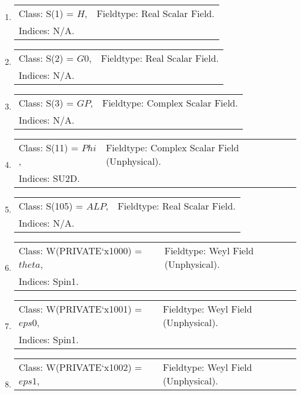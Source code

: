 \documentclass[11pt]{article}
\begin{document}
\begin{enumerate}
\item 
\begin{tabular}{ll}
Class: S(1) = $ H $, &  Fieldtype: Real Scalar Field.\\ 
\multicolumn{2}{l}{Indices: N/A.}\\ 
\end{tabular}
\item 
\begin{tabular}{ll}
Class: S(2) = $ G0 $, &  Fieldtype: Real Scalar Field.\\ 
\multicolumn{2}{l}{Indices: N/A.}\\ 
\end{tabular}
\item 
\begin{tabular}{ll}
Class: S(3) = $ GP $, &  Fieldtype: Complex Scalar Field.\\ 
\multicolumn{2}{l}{Indices: N/A.}\\ 
\end{tabular}
\item 
\begin{tabular}{ll}
Class: S(11) = $ Phi $, &  Fieldtype: Complex Scalar Field (Unphysical).\\ 
\multicolumn{2}{l}{Indices: SU2D.}\\ 
\end{tabular}
\item 
\begin{tabular}{ll}
Class: S(105) = $ ALP $, &  Fieldtype: Real Scalar Field.\\ 
\multicolumn{2}{l}{Indices: N/A.}\\ 
\end{tabular}
\item 
\begin{tabular}{ll}
Class: W(PRIVATE`x1000) = $ theta $, &  Fieldtype: Weyl Field (Unphysical).\\ 
\multicolumn{2}{l}{Indices: Spin1.}\\ 
\end{tabular}
\item 
\begin{tabular}{ll}
Class: W(PRIVATE`x1001) = $ eps0 $, &  Fieldtype: Weyl Field (Unphysical).\\ 
\multicolumn{2}{l}{Indices: Spin1.}\\ 
\end{tabular}
\item 
\begin{tabular}{ll}
Class: W(PRIVATE`x1002) = $ eps1 $, &  Fieldtype: Weyl Field (Unphysical).\\ 

\end{tabular}
\end{enumerate}
\end{document}
